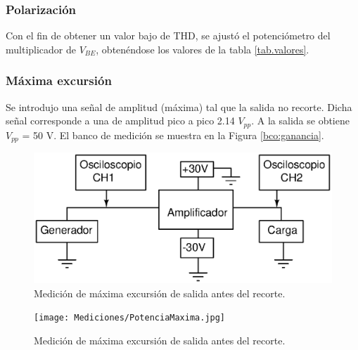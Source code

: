 

		\subsubsection{Polarización}
			Con el fin de obtener un valor bajo de THD, se ajustó el potenciómetro del multiplicador de $V_{BE}$, obtenéndose los valores de la tabla \ref{tab.valores}.

		\subsubsection{Máxima excursión}
		Se introdujo una señal de amplitud (máxima) tal que la salida no recorte. Dicha señal corresponde a una
		de amplitud pico a pico 2.14 $V_{pp}$. A la salida se obtiene $V_{pp}$ = 50 V. El banco de medición se muestra en la Figura \ref{bco:ganancia}.

		\begin{figure}[h!]
			\centering
			\includegraphics[scale=0.5]{Figuras/bco_ganancia.eps}
			\caption{Medición de máxima excursión de salida antes del recorte.}
			\label{fig:bco_ganancia}
		\end{figure}

		\begin{figure}[h!]
			\centering
			\texttt{[image: Mediciones/PotenciaMaxima.jpg]}
			\caption{Medición de máxima excursión de salida antes del recorte.}
			\label{fig:MaxExcur}
		\end{figure}

